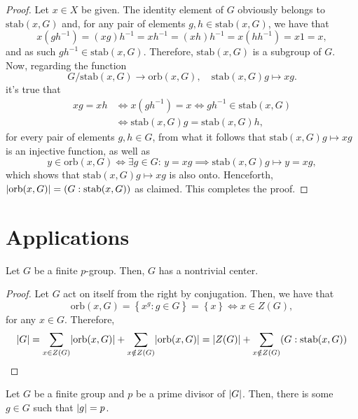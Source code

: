 \begin{proof}
  Let \(x\in{X}\) be given. The identity element of \(G\) obviously belongs to
  \(\text{stab}(x,G)\) and, for any pair of elements \(g,h\in{\text{stab}(x,G)}\), we have that
  \[
    x(gh^{-1})=(xg)h^{-1}=xh^{-1}=(xh)h^{-1}=x(hh^{-1})=x1=x,
  \]
  and as such \(gh^{-1}\in{\text{stab}(x,G)}\). Therefore, \(\text{stab}(x,G)\) is a subgroup of
  \(G\). Now, regarding the function
  \[
    G/\text{stab}(x,G)\to{\text{orb}(x,G)},
    \quad
    \text{stab}(x,G)g\mapsto{xg}.
  \]
  it's true that
  \begin{align*}
    xg=xh
    &\iff
    x(gh^{-1})=x
    \iff
    gh^{-1}\in{\text{stab}(x,G)}
    \\
    &\iff
    \text{stab}(x,G)g=\text{stab}(x,G)h,
  \end{align*}
  for every pair of elements \(g,h\in{G}\), from what it follows that
  \(\text{stab}(x,G)g\mapsto{xg}\) is an injective function, as well as
  \[
    y\in{\text{orb}(x,G)}
    \iff
    \exists{g\in{G}}:\,
    y=xg
    \implies
    \text{stab}(x,G)g\mapsto{y=xg},
  \]
  which shows that \(\text{stab}(x,G)g\mapsto{xg}\) is also onto. Henceforth,
  \(\lvert\text{orb}(x,G)\rvert=(G:\text{stab}(x,G))\) as claimed. This completes the proof.
\end{proof}

\section{Applications}\label{sec:applications}

\begin{proposition}\label{prop:class-equation}
  Let \(G\) be a finite \(p\)-group. Then, \(G\) has a nontrivial center.
\end{proposition}

\begin{proof}
  Let \(G\) act on itself from the right by conjugation. Then, we have that
  \[
    \text{orb}(x,G)
    =
    \left\{x^{g}:g\in{G}\right\}
    =
    \left\{x\right\}
    \iff
    x\in{Z(G)},
  \]
  for any \(x\in{G}\). Therefore,
  \[
    \lvert G\rvert
    =
    \sum_{x\in{Z(G)}}\lvert\text{orb}(x,G)\rvert
    +
    \sum_{x\notin{Z(G)}}\lvert\text{orb}(x,G)\rvert
    =
    \lvert Z(G)\rvert
    +
    \sum_{x\notin{Z(G)}}(G:\text{stab}(x,G))
  \]
\end{proof}

\begin{theorem}[Cauchy]\label{thm:cauchys-theorem}
  Let \(G\) be a finite group and \(p\) be a prime divisor of \(\lvert G\rvert\).
  Then, there is some \(g\in{G}\) such that \(\lvert g\rvert=p\).
\end{theorem}

